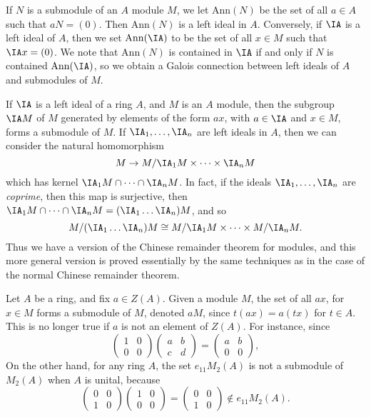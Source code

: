\begin{example}
    If $N$ is a submodule of an $A$ module $M$, we let $\text{Ann}(N)$ be the set of all $a \in A$ such that $aN = (0)$. Then $\text{Ann}(N)$ is a left ideal in $A$. Conversely, if $\IA$ is a left ideal of $A$, then we set $\text{Ann}(\IA)$ to be the set of all $x \in M$ such that $\IA x = (0)$. We note that $\text{Ann}(N)$ is contained in $\IA$ if and only if $N$ is contained $\text{Ann}(\IA)$, so we obtain a Galois connection between left ideals of $A$ and submodules of $M$.
\end{example}

\begin{example}
    If $\IA$ is a left ideal of a ring $A$, and $M$ is an $A$ module, then the subgroup $\IA M$ of $M$ generated by elements of the form $ax$, with $a \in \IA$ and $x \in M$, forms a submodule of $M$. If $\IA_1, \dots, \IA_n$ are left ideals in $A$, then we can consider the natural homomorphism
    \[ M \to M/\IA_1 M \times \dots \times \IA_n M \]
    which has kernel $\IA_1 M \cap \dots \cap \IA_n M$. In fact, if the ideals $\IA_1, \dots, \IA_n$ are \emph{coprime}, then this map is surjective, then $\IA_1 M \cap \dots \cap \IA_n M = (\IA_1 \dots \IA_n) M$, and so
    \[ M / (\IA_1 \dots \IA_n) M \cong M/\IA_1 M \times \dots \times M/\IA_n M. \]
    Thus we have a version of the Chinese remainder theorem for modules, and this more general version is proved essentially by the same techniques as in the case of the normal Chinese remainder theorem.
\end{example}

\begin{example}
    Let $A$ be a ring, and fix $a \in Z(A)$. Given a module $M$, the set of all $ax$, for $x \in M$ forms a submodule of $M$, denoted $aM$, since $t(ax) = a(tx)$ for $t \in A$. This is no longer true if $a$ is not an element of $Z(A)$. For instance, since
    \[ \begin{pmatrix} 1 & 0 \\ 0 & 0 \end{pmatrix} \begin{pmatrix} a & b \\ c & d \end{pmatrix} = \begin{pmatrix} a & b \\ 0 & 0 \end{pmatrix}, \]
    On the other hand, for any ring $A$, the set $e_{11} M_2(A)$ is not a submodule of $M_2(A)$ when $A$ is unital, because
    \[ \begin{pmatrix} 0 & 0 \\ 1 & 0 \end{pmatrix} \begin{pmatrix} 1 & 0 \\ 0 & 0 \end{pmatrix} = \begin{pmatrix} 0 & 0 \\ 1 & 0 \end{pmatrix} \not \in e_{11} M_2(A). \]
\end{example}

